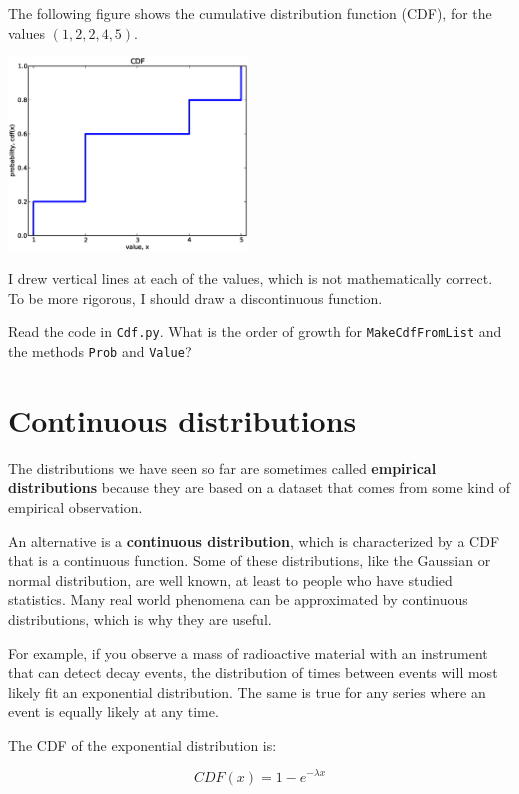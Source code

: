 \documentclass[10pt]{book}
\begin{document}
The following figure shows the cumulative distribution
function (CDF), for the values $(1,2,2,4,5)$.

\beforefig
\centerline{\includegraphics[width=2.5in]{figs/cdf_example.eps}}
\afterfig

I drew vertical lines at each of the values, which is not
mathematically correct.  To be more rigorous, I should draw
a discontinuous function.

\begin{ex}

Read the code in {\tt Cdf.py}.  What is the order of growth for
{\tt MakeCdfFromList} and the methods {\tt Prob} and {\tt Value}?

\end{ex}


\section{Continuous distributions}

The distributions we have seen so far are sometimes called
{\bf empirical distributions} because they are based on a
dataset that comes from some kind of empirical observation.

An alternative is a {\bf continuous distribution},
which is characterized by a CDF that is a continuous function.
Some of these distributions, like the
Gaussian or normal
distribution, are well known, at least to people who have studied
statistics.  Many real world phenomena can be approximated by
continuous distributions, which is why they are useful.

For example, if you observe a mass of radioactive material with
an instrument that can detect decay events, the distribution
of times between events will most likely fit an exponential
distribution.  The same is true for any series where
an event is equally likely at any time.

The CDF of the exponential distribution is:

\[ CDF(x) = 1 - e^{-\lambda x} \]
\end{document}
